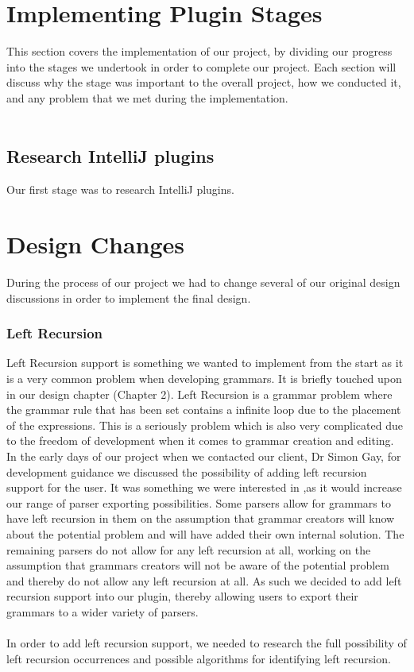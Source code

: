 \documentclass{l3proj}
\begin{document}
\section{Implementing Plugin Stages}
This section covers the implementation of our project, by dividing our progress into the stages we undertook in order to complete our project. Each section will discuss why the stage was important to the overall project, how we conducted it, and any problem that we met during the implementation.\\
\\
\subsection{Research IntelliJ plugins}
Our first stage was to research IntelliJ plugins. 
\section{Design Changes}
During the process of our project we had to change several of our original design discussions in order to implement the final design. 

\subsubsection{Left Recursion}
Left Recursion support is something we wanted to implement from the start as it is a very common problem when developing grammars. It is briefly touched upon in our design chapter (Chapter 2). Left Recursion is a grammar problem where the grammar rule that has been set contains a infinite loop due to the placement of the expressions. This is a seriously problem which is also very complicated due to the freedom of development when it comes to grammar creation and editing. In the early days of our project when we contacted our client, Dr Simon Gay, for development guidance we discussed the possibility of adding left recursion support for the user. It was something we were interested in ,as it would increase our range of parser exporting possibilities. Some parsers allow for grammars to have left recursion in them on the assumption that grammar creators will know about the potential problem and will have added their own internal solution. The remaining parsers do not allow for any left recursion at all, working on the assumption that grammars creators will not be aware of the potential problem and thereby do not allow any left recursion at all. As such we decided to add left recursion support into our plugin, thereby allowing users to export their grammars to a wider variety of parsers. \\
\\
In order to add left recursion support, we needed to research the full possibility of left recursion occurrences and possible algorithms for identifying left recursion. 
\end{document}
